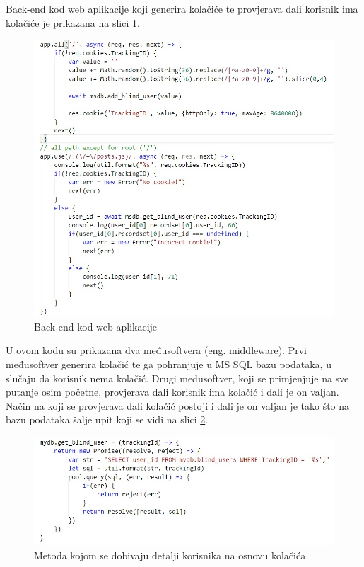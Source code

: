 \documentclass[12pt, oneside, onecolumn]{book}
\begin{document}
{Back-end kod web aplikacije koji generira kolačiće te provjerava dali korisnik ima kolačiće je prikazana na slici \ref{fig:bsqli_b}.

\begin{figure}[H]
	\begin{center}
		\includegraphics[width=\textwidth]{bsqli_b.jpg}
		\caption{Back-end kod web aplikacije} \label{fig:bsqli_b}
	\end{center}
\end{figure}

U ovom kodu su prikazana dva međusoftvera (eng. middleware). Prvi međusoftver generira kolačić te ga pohranjuje u MS SQL bazu podataka, u slučaju da korisnik nema kolačić. Drugi međusoftver, koji se primjenjuje na sve putanje osim početne, provjerava dali korisnik ima kolačić i dali je on valjan. Način na koji se provjerava dali kolačić postoji i dali je on valjan je tako što na bazu podataka šalje upit koji se vidi na slici \ref{fig:bsqli_db}. 

\begin{figure}[H]
	\begin{center}
		\includegraphics[width=\textwidth]{bsqli_db.jpg}
		\caption{Metoda kojom se dobivaju detalji korisnika na osnovu kolačića} \label{fig:bsqli_db}
	\end{center}
\end{figure}

}
\end{document}
